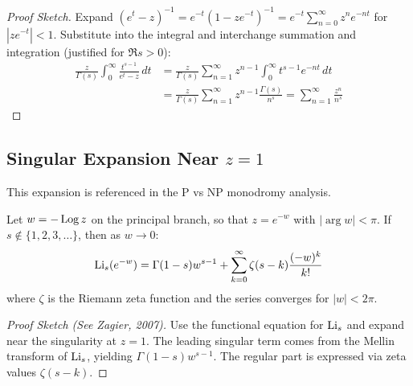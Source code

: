 \begin{proof}[Proof Sketch]
Expand $(e^t - z)^{-1} = e^{-t} (1 - z e^{-t})^{-1} = e^{-t} \sum_{n=0}^{\infty} z^n e^{-nt}$ for $|z e^{-t}| < 1$. Substitute into the integral and interchange summation and integration (justified for $\Re s > 0$):
\begin{align}
\frac{z}{\Gamma(s)} \int_0^{\infty} \frac{t^{s-1}}{e^t - z} \, dt &= \frac{z}{\Gamma(s)} \sum_{n=1}^{\infty} z^{n-1} \int_0^{\infty} t^{s-1} e^{-nt} \, dt \\
&= \frac{z}{\Gamma(s)} \sum_{n=1}^{\infty} z^{n-1} \frac{\Gamma(s)}{n^s} = \sum_{n=1}^{\infty} \frac{z^n}{n^s}
\end{align}
\end{proof}

\subsection{Singular Expansion Near \texorpdfstring{$z = 1$}{z = 1}}

This expansion is referenced in the P vs NP monodromy analysis.

\begin{theorem}[Singular Expansion Near $z = 1$]\label{thm:Li-expansion}
Let $w = -\operatorname{Log} z$ on the principal branch, so that $z = e^{-w}$ with $|\arg w| < \pi$. If $s \notin \{1, 2, 3, \ldots\}$, then as $w \to 0$:
\begin{equation}
\operatorname{Li}_s(e^{-w}) = \Gamma(1-s) w^{s-1} + \sum_{k=0}^{\infty} \zeta(s-k) \frac{(-w)^k}{k!}
\end{equation}
where $\zeta$ is the Riemann zeta function and the series converges for $|w| < 2\pi$.
\end{theorem}

\begin{proof}[Proof Sketch (See Zagier, 2007)]
Use the functional equation for $\operatorname{Li}_s$ and expand near the singularity at $z = 1$. The leading singular term comes from the Mellin transform of $\operatorname{Li}_s$, yielding $\Gamma(1-s) w^{s-1}$. The regular part is expressed via zeta values $\zeta(s-k)$.
\end{proof}

